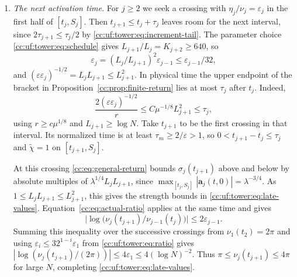 \begin{enumerate}[leftmargin=*]
To check the comparison on this interval, \eqref{cc:uf:tower:eq:derived-low}
at $j-2$ gives $\|B\|_\infty\le\lambda_{j-2}^9\le\mu^{1/32}$ and
$\|B_t\|_\infty\le\mu^{1/16}$, since $\lambda_{j-2}=\mu^{1/K_{j-1}}$
and $K_{j-1}>288$. With $\eta=\nu\varepsilon$, the three terms in
\eqref{cc:uf:tower:eq:active-error} give
\[
 \delta\le C\bigl(\varepsilon^{-1}L_{j+1}^3\mu^{-1/16}
                   +\mu^{-3/32}+\mu^{-1/4}\bigr).
\]
By \eqref{cc:uf:tower:eq:uniform}, $L_j\le L_{j+1}\le(\log\mu)^2$.
Thus $C_0(2r\tau_j)^{C_0}\delta/\varepsilon$ is bounded by
$\mu^{-1/16}$ times a fixed power of $\log\mu$, and
$C_0\varepsilon\le C_0(\log N)^{-2}$. For large $N$ both conditions
of \eqref{cc:eq:finite-smallness} hold. In the resulting central estimates
\eqref{cc:uf:tower:eq:later-origin}, $CS=Cr/(2\nu)\le C\mu^{1/8}L_j$
and $2/(\nu\varepsilon)\le 2L_j^2/\pi$. Both are at most $\mu\le\mathsf D$
for large $N$. This proves \eqref{cc:uf:tower:eq:wave-origin} for wave $j$.

\item \emph{The next activation time.}
For $j\ge2$ we seek a crossing with $\eta_j/\nu_j=\varepsilon_j$ in
the first half of $[t_j,S_j]$. Then $t_{j+1}\le t_j+\tau_j$ leaves
room for the next interval, since $2\tau_{j+1}\le\tau_j/2$ by
\eqref{cc:uf:tower:eq:increment-tail}. The parameter choice
\eqref{cc:uf:tower:eq:schedule} gives $L_{j+1}/L_j=K_{j+2}\ge640$, so
\begin{equation}\label{cc:uf:tower:eq:ratio}
 \varepsilon_j=(L_j/L_{j+1})^2\varepsilon_{j-1}\le\varepsilon_{j-1}/32,
\end{equation}
and $(\varepsilon\varepsilon_j)^{-1/2}=L_jL_{j+1}\le L_{j+1}^2$.
In physical time the upper endpoint of the bracket in
Proposition~\ref{cc:prop:finite-return} lies at most $\tau_j$ after $t_j$. Indeed,
\[
 \frac{2(\varepsilon\varepsilon_j)^{-1/2}}{r}
 \le C\mu^{-1/8}L_{j+1}^2\le\tau_j ,
\]
using $r\ge c\mu^{1/8}$ and $L_{j+1}\ge\log N$. Take $t_{j+1}$ to be
the first crossing in that interval. Its normalized time is at least
$\tau_m\ge2/\varepsilon>1$, so $0<t_{j+1}-t_j\le\tau_j$ and
$\widetilde\chi=1$ on $[t_{j+1},S_j]$.

At this crossing \eqref{cc:eq:general-return} bounds $\sigma_j(t_{j+1})$
above and below by absolute multiples of $\lambda^{1/4}L_jL_{j+1}$,
since $\max_{[t_j,S_j]}|\mathbf a_j(t,0)|=\lambda^{-3/4}$.
As $1\le L_jL_{j+1}\le L_{j+1}^2$, this gives the strength bounds in
\eqref{cc:uf:tower:eq:late-values}. Equation~\eqref{cc:eq:actual-ratio}
applies at the same time and gives
\[
 \bigl|\log\bigl(\nu_j(t_{j+1})/\nu_{j-1}(t_j)\bigr)\bigr|
 \le2\varepsilon_{j-1}.
\]
Summing this inequality over the successive crossings from
$\nu_1(t_2)=2\pi$ and using
$\varepsilon_i\le32^{1-i}\varepsilon_1$ from \eqref{cc:uf:tower:eq:ratio}
gives $|\log(\nu_j(t_{j+1})/(2\pi))|\le4\varepsilon_1\le4(\log N)^{-2}$.
Thus $\pi\le\nu_j(t_{j+1})\le4\pi$ for large $N$, completing
\eqref{cc:uf:tower:eq:late-values}.


\end{enumerate}
